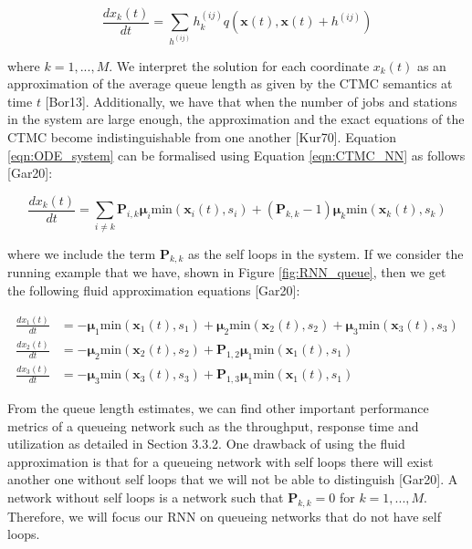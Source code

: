 \documentclass[a4paper,11pt,titlepage]{article}
\begin{document}
\begin{equation}
    \frac{d x_k(t)}{dt} = \sum_{h^{(ij)}} h_k^{(ij)} q(\mathbf{x}(t), \mathbf{x}(t)+h^{(ij)})
    \label{eqn:ODE_system}
\end{equation}

where $k = 1,...,M$. We interpret the solution for each coordinate $x_k(t)$ as an approximation of the average queue length as given by the CTMC semantics at time $t$ [Bor13]. Additionally, we have that when the number of jobs and stations in the system are large enough, the approximation and the exact equations of the CTMC become indistinguishable from one another [Kur70]. Equation \ref{eqn:ODE_system} can be formalised using Equation \ref{eqn:CTMC_NN} as follows [Gar20]: 

\begin{equation}
    \frac{d x_k(t)}{dt} = \sum_{i \neq k} \mathbf{P}_{i,k} \bm{\mu}_i \text{min} (\mathbf{x}_i (t), s_i) + ( \mathbf{P}_{k,k} -1) \bm{\mu}_k \text{min} (\mathbf{x}_k (t), s_k)
\end{equation}

where we include the term $\mathbf{P}_{k,k}$ as the self loops in the system. If we consider the running example that we have, shown in Figure \ref{fig:RNN_queue}, then we get the following fluid approximation equations [Gar20]: 

\begin{align}
    \frac{d x_1(t)}{dt} &= -\bm{\mu}_1 \text{min}(\mathbf{x}_1 (t), s_1) + \bm{\mu}_2 \text{min}(\mathbf{x}_2 (t), s_2) + \bm{\mu}_3 \text{min} (\mathbf{x}_3 (t), s_3) \\
    \frac{d x_2(t)}{dt} &= -\bm{\mu}_2 \text{min}(\mathbf{x}_2 (t), s_2) + \mathbf{P}_{1,2} \bm{\mu}_1 \text{min}(\mathbf{x}_1 (t), s_1) \\
    \frac{d x_3(t)}{dt} &= -\bm{\mu}_3 \text{min}(\mathbf{x}_3 (t), s_3) + \mathbf{P}_{1,3} \bm{\mu}_1 \text{min}(\mathbf{x}_1 (t), s_1)
\end{align}

From the queue length estimates, we can find other important performance metrics of a queueing network such as the throughput, response time and utilization as detailed in Section 3.3.2. One drawback of using the fluid approximation is that for a queueing network with self loops there will exist another one without self loops that we will not be able to distinguish [Gar20]. A network without self loops is a network such that $\mathbf{P}_{k,k} = 0$ for $k = 1,...,M$. Therefore, we will focus our RNN on queueing networks that do not have self loops.
\end{document}
